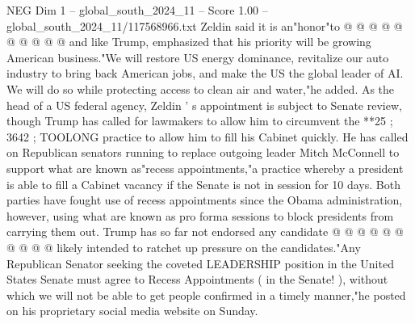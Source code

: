 \begin{textsample}{NEG Dim 1 – global\_south\_2024\_11 – Score 1.00 – global\_south\_2024\_11/117568966.txt}
Zeldin said it is an"honor"to @ @ @ @ @ @ @ @ @ @ and like Trump, emphasized that his priority will be growing American business."We will restore US energy dominance, revitalize our auto industry to bring back American jobs, and make the US the global leader of AI.
We will do so while protecting access to clean air and water,"he added.
As the head of a US federal agency, Zeldin ' s appointment is subject to Senate review, though Trump has called for lawmakers to allow him to circumvent the **25 ; 3642 ; TOOLONG practice to allow him to fill his Cabinet quickly.
He has called on Republican senators running to replace outgoing leader Mitch McConnell to support what are known as"recess appointments,"a practice whereby a president is able to fill a Cabinet vacancy if the Senate is not in session for 10 days.
Both parties have fought use of recess appointments since the Obama administration, however, using what are known as pro forma sessions to block presidents from carrying them out.
Trump has so far not endorsed any candidate @ @ @ @ @ @ @ @ @ @ likely intended to ratchet up pressure on the candidates."Any Republican Senator seeking the coveted LEADERSHIP position in the United States Senate must agree to Recess Appointments ( in the Senate! ), without which we will not be able to get people confirmed in a timely manner,"he posted on his proprietary social media website on Sunday.

\end{textsample}
